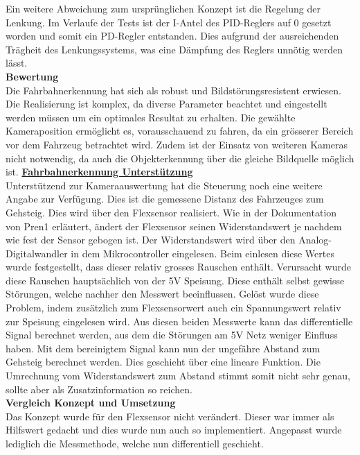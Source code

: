 Ein weitere Abweichung zum ursprünglichen Konzept ist die Regelung der Lenkung. Im Verlaufe der Tests ist der I-Antel des PID-Reglers auf 0 gesetzt worden und somit ein PD-Regler entstanden. Dies aufgrund der ausreichenden Trägheit des Lenkungssystems, was eine Dämpfung des Reglers unnötig werden lässt.\\[0.2cm]
\textbf{Bewertung}\\[0.2cm]
Die Fahrbahnerkennung hat sich als robust und Bildstörungsresistent erwiesen. Die Realisierung ist komplex, da diverse Parameter beachtet und eingestellt werden müssen um ein optimales Resultat zu erhalten. Die gewählte Kameraposition ermöglicht es, vorausschauend zu fahren, da ein grösserer Bereich vor dem Fahrzeug betrachtet wird. Zudem ist der Einsatz von weiteren Kameras nicht notwendig, da auch die Objekterkennung über die gleiche Bildquelle möglich ist.
\newpage
\underline{\textbf{Fahrbahnerkennung Unterstützung}}\\[0.2cm]
Unterstützend zur Kameraauswertung hat die Steuerung noch eine weitere Angabe zur Verfügung. Dies ist die gemessene Distanz des Fahrzeuges zum Gehsteig. Dies wird über den Flexsensor realisiert. Wie in der Dokumentation von Pren1 erläutert, ändert der Flexsensor seinen Widerstandswert je nachdem wie fest der Sensor gebogen ist. Der Widerstandswert wird über den Analog-Digitalwandler in dem Mikrocontroller eingelesen. Beim einlesen diese Wertes wurde festgestellt, dass dieser relativ grosses Rauschen enthält. Verursacht wurde diese Rauschen hauptsächlich von der 5V Speisung. Diese enthält selbst gewisse Störungen, welche nachher den Messwert beeinflussen. Gelöst wurde diese Problem, indem zusätzlich zum Flexsensorwert auch ein Spannungswert relativ zur Speisung eingelesen wird. Aus diesen beiden Messwerte kann das differentielle Signal berechnet werden, aus dem die Störungen am 5V Netz weniger Einfluss haben. Mit dem bereinigtem Signal kann nun der ungefähre Abstand zum Gehsteig berechnet werden. Dies geschieht über eine lineare Funktion. Die Umrechnung vom Widerstandswert zum Abstand stimmt somit nicht sehr genau, sollte aber als Zusatzinformation so reichen.%
\\[0.2cm]
\textbf{Vergleich Konzept und Umsetzung}\\[0.2cm]
Das Konzept wurde für den Flexsensor nicht verändert. Dieser war immer als Hilfswert gedacht und dies wurde nun auch so implementiert. Angepasst wurde lediglich die Messmethode, welche nun differentiell geschieht.